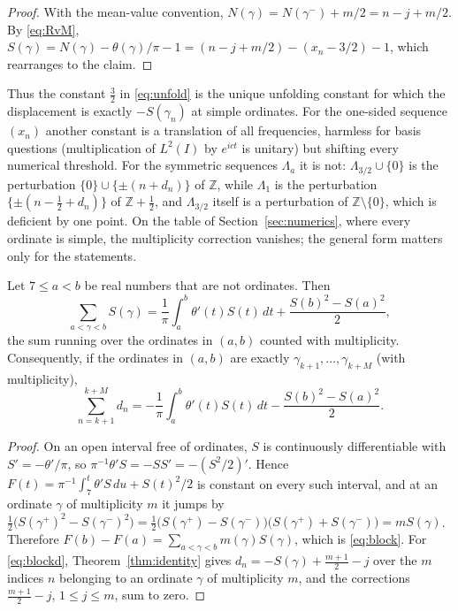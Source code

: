 \documentclass[11pt]{article}
\newcommand{\Z}{\mathbb{Z}}
\newcommand{\Lam}{\Lambda}
\begin{document}
\begin{proof}
With the mean-value convention, $N(\gamma)=N(\gamma^-)+m/2=n-j+m/2$. By \eqref{eq:RvM}, $S(\gamma)=N(\gamma)-\theta(\gamma)/\pi-1=(n-j+m/2)-(x_n-3/2)-1$, which rearranges to the claim.
\end{proof}

Thus the constant $\frac32$ in \eqref{eq:unfold} is the unique unfolding constant for which the displacement is exactly $-S(\gamma_n)$ at simple ordinates. For the one-sided sequence $(x_n)$ another constant is a translation of all frequencies, harmless for basis questions (multiplication of $L^2(I)$ by $e^{ict}$ is unitary) but shifting every numerical threshold. For the symmetric sequences $\Lam_a$ it is not: $\Lam_{3/2}\cup\{0\}$ is the perturbation $\{0\}\cup\{\pm(n+d_n)\}$ of $\Z$, while $\Lam_1$ is the perturbation $\{\pm(n-\frac12+d_n)\}$ of $\Z+\frac12$, and $\Lam_{3/2}$ itself is a perturbation of $\Z\setminus\{0\}$, which is deficient by one point. On the table of Section~\ref{sec:numerics}, where every ordinate is simple, the multiplicity correction vanishes; the general form matters only for the statements.

\begin{proposition}\label{prop:block}
Let $7\le a<b$ be real numbers that are not ordinates. Then
\begin{equation}\label{eq:block}
\sum_{a<\gamma<b}S(\gamma)=\frac1\pi\int_a^b\theta'(t)S(t)\,dt+\frac{S(b)^2-S(a)^2}{2},
\end{equation}
the sum running over the ordinates in $(a,b)$ counted with multiplicity. Consequently, if the ordinates in $(a,b)$ are exactly $\gamma_{k+1},\dots,\gamma_{k+M}$ (with multiplicity),
\begin{equation}\label{eq:blockd}
\sum_{n=k+1}^{k+M}d_n=-\frac1\pi\int_a^b\theta'(t)S(t)\,dt-\frac{S(b)^2-S(a)^2}{2}.
\end{equation}
\end{proposition}

\begin{proof}
On an open interval free of ordinates, $S$ is continuously differentiable with $S'=-\theta'/\pi$, so $\pi^{-1}\theta'S=-SS'=-(S^2/2)'$. Hence $F(t)=\pi^{-1}\int_7^t\theta'S\,du+S(t)^2/2$ is constant on every such interval, and at an ordinate $\gamma$ of multiplicity $m$ it jumps by $\frac12\bigl(S(\gamma^+)^2-S(\gamma^-)^2\bigr)=\frac12\bigl(S(\gamma^+)-S(\gamma^-)\bigr)\bigl(S(\gamma^+)+S(\gamma^-)\bigr)=mS(\gamma)$. Therefore $F(b)-F(a)=\sum_{a<\gamma<b}m(\gamma)S(\gamma)$, which is \eqref{eq:block}. For \eqref{eq:blockd}, Theorem~\ref{thm:identity} gives $d_n=-S(\gamma)+\frac{m+1}{2}-j$ over the $m$ indices $n$ belonging to an ordinate $\gamma$ of multiplicity $m$, and the corrections $\frac{m+1}{2}-j$, $1\le j\le m$, sum to zero.
\end{proof}
\end{document}
